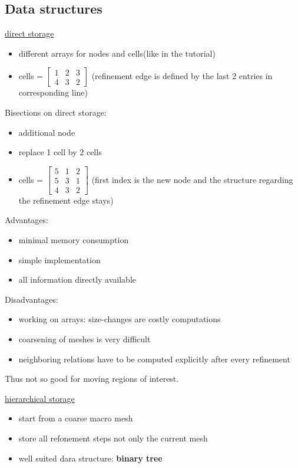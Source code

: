 \subsection{Data structures}
\underline{direct storage}
\begin{itemize}
	\item different arrays for nodes and cells(like in the tutorial)
	
	\item cells = 
	$\begin{bmatrix}
		1 & 2 & 3\\
		4 & 3 & 2
	\end{bmatrix} $ (refinement edge is defined by the last 2 entries in corresponding line)
	
\end{itemize}
Bisections on direct storage:
\begin{itemize}
	\item additional node
	\item replace 1 cell by 2 cells
	
	\item cells = 
	$\begin{bmatrix}
	5 & 1 & 2\\
	5 & 3 & 1\\
	4 & 3 & 2
	\end{bmatrix} $ (first index is the new node and the structure regarding the refinement edge stays)
	
\end{itemize}

Advantages:
\begin{itemize}
	\item minimal memory consumption
	\item simple implementation
	\item all information directly available
\end{itemize}

Disadvantages:
\begin{itemize}
	\item working on arrays: size-changes are costly computations
	\item coarsening of meshes is very difficult
	\item neighboring relations have to be computed explicitly after every refinement
\end{itemize}
Thus not so good for moving regions of interest.
\vspace{1cm}

\underline{hierarchical storage}
\begin{itemize}
	\item start from a coarse \glqq macro mesh \grqq
	\item store all refonement steps not only the current mesh
	\item well suited dara structure: \textbf{binary tree}
\end{itemize}

